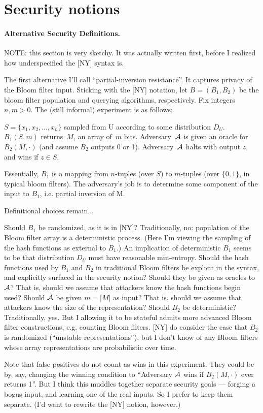 \section{Security notions}

\paragraph{Alternative Security Definitions. }
NOTE: this section is very sketchy.  It was actually written first, before I realized how underspecified the [NY] syntax is.

The first alternative I'll call “partial-inversion resistance”.  It captures privacy of the Bloom filter input.  Sticking with the [NY] notation, let $B=(B_1, B_2)$ be the bloom filter population and querying algorithms, respectively.  Fix integers $n,m > 0$.  The (still informal) experiment is as follows: 

$S=\{x_1,x_2,..., x_n\}$ sampled from U according to some distribution $D_U$.  $B_1(S,m)$ returns~$M$, an array of~$m$ bits. Adversary~$\mathcal{A}$ is given an oracle for $B_2(M,\cdot)$  (and assume $B_2$ outputs 0 or 1).  Adversary~$\mathcal{A}$ halts with output $z$, and wins if $z \in S$.

Essentially, $B_1$ is a mapping from $n$-tuples (over $S$) to $m$-tuples (over $\{0,1\}$, in typical bloom filters).  The adversary's job is to determine some component of the input to $B_1$, i.e. partial inversion of M. 

Definitional choices remain...

Should $B_1$ be randomized, as it is in [NY]?  Traditionally, no: population of the Bloom filter array is a deterministic process.  (Here I'm viewing the sampling of the hash functions as external to $B_1$.)   An implication of deterministic $B_1$ seems to be that distribution $D_U$ must have reasonable min-entropy.  
Should the hash functions used by $B_1$ and $B_2$ in traditional Bloom filters be explicit in the syntax, and explicitly surfaced in the security notion?  
Should they be given as oracles to $\mathcal{A}$?  That is, should we assume that attackers know the hash functions begin used? Should $\mathcal{A}$ be given $m = |M|$ as input?  That is, should we assume that attackers know the size of the representation?
Should $B_2$ be deterministic?  Traditionally, yes.  But I allowing it to be stateful admits more advanced Bloom filter constructions, e.g. counting Bloom filters.  [NY] do consider the case that $B_2$ is randomized (“unstable representations”), but I don't know of any Bloom filters whose array representations are probabilistic over time.

Note that false positives do not count as wins in this experiment.  They could be by, say, changing the winning condition to “Adversary $\mathcal{A}$ wins if $B_2(M,\cdot)$ ever returns 1”.  But I think this muddles together separate security goals --- forging a bogus input, and learning one of the real inputs.  So I prefer to keep them separate.  (I'd want to rewrite the [NY] notion, however.)

